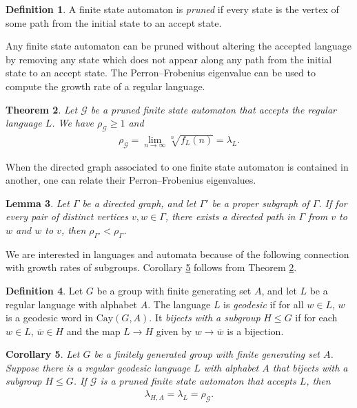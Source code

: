 \documentclass[11pt,letterpaper]{amsart}
\newtheorem{theorem}{Theorem}[section]
\newtheorem{lemma}[theorem]{Lemma}
\newtheorem{corollary}[theorem]{Corollary}
\theoremstyle{definition}
\newtheorem{definition}[theorem]{Definition}
\theoremstyle{plain}
\theoremstyle{TheoremNum}
\begin{document}
\begin{definition}
    A finite state automaton is \emph{pruned} if every state is the vertex of some path from the initial state to an accept state.
\end{definition}
Any finite state automaton can be pruned without altering the accepted language by removing any state which does not appear along any path from the initial state to an accept state. The Perron--Frobenius eigenvalue can be used to compute the growth rate of a regular language.

\begin{theorem}\cite[Theorem~3.6]{DFW}\label{thm:DFW-3-6}
    Let $\mathcal{G}$ be a pruned finite state automaton that accepts the regular language $L$. We have $\rho_{\mathcal{G}} \geq 1$ and
    \begin{align*}
        \rho_{\mathcal{G}} = \lim_{n \rightarrow \infty} \sqrt[n]{f_L(n)} = \lambda_L\text{.}
    \end{align*}
\end{theorem}
When the directed graph associated to one finite state automaton is contained in another, one can relate their Perron--Frobenius eigenvalues.
\begin{lemma}\cite[Lemma~3.2 and Theorem~3.4]{DFW}
    Let $\Gamma$ be a directed graph, and let $\Gamma'$ be a proper subgraph of $\Gamma$. If for every pair of distinct vertices $v,w \in \Gamma$, there exists a directed path in $\Gamma$ from $v$ to $w$ and $w$ to $v$, then $\rho_{\Gamma'} < \rho_{\Gamma}$.
\end{lemma}

We are interested in languages and automata because of the following connection with growth rates of subgroups. Corollary \ref{cor:growth-by-automaton} follows from Theorem \ref{thm:DFW-3-6}.
\begin{definition}
    Let $G$ be a group with finite generating set $A$, and let $L$ be a regular language with alphabet $A$. The language $L$ is \emph{geodesic} if for all $w \in L$, $w$ is a geodesic word in $\text{Cay}(G,A)$. It \emph{bijects with a subgroup} $H \leq G$ if for each $w \in L$, $\overline{w} \in H$ and the map $L \rightarrow H$ given by $w \rightarrow \overline{w}$ is a bijection.
\end{definition}
\begin{corollary}\label{cor:growth-by-automaton}
    Let $G$ be a finitely generated group with finite generating set $A$. Suppose there is a regular geodesic language $L$ with alphabet $A$ that bijects with a subgroup $H \leq G$. If $\mathcal{G}$ is a pruned finite state automaton that accepts $L$, then
    \begin{align*}
        \lambda_{H,A} = \lambda_L = \rho_{\mathcal{G}}\text{.}
    \end{align*}
\end{corollary}
\end{document}
